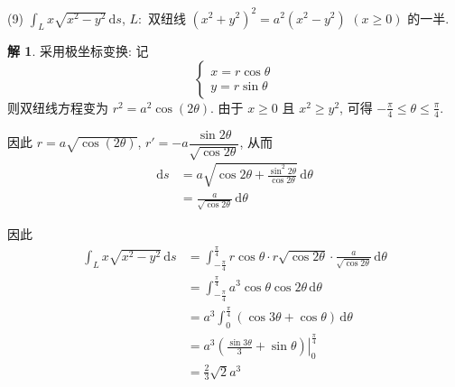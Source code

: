 \documentclass[a4paper,12pt]{article}
\theoremstyle{definition}
\newtheorem*{sol}{解}
\begin{document}
(9) $\int_L x\sqrt{x^2 - y^2} \, \mathrm{d}s$, $L:$ 双纽线 $(x^2 + y^2)^2 = a^2(x^2 - y^2)$ $(x \geqslant 0)$ 的一半.
\begin{sol}
    采用极坐标变换: 记
    $$
        \begin{cases}
            x = r\cos\theta \\
            y = r\sin\theta
        \end{cases}
    $$
    则双纽线方程变为 $r^2 = a^2\cos(2\theta)$. 由于 $x \geq 0$ 且 $x^2 \geq y^2$, 可得 $-\frac{\pi}{4} \leq \theta \leq \frac{\pi}{4}$.

    因此 $r = a\sqrt{\cos(2\theta)}$, $r' = -a\dfrac{\sin 2\theta}{\sqrt{\cos 2\theta}}$, 从而
    \begin{align*}
        \mathrm{d}s
         & = a\sqrt{\cos 2\theta + \frac{\sin^2 2\theta}{\cos 2\theta}} \, \mathrm{d}\theta \\
         & = \frac{a}{\sqrt{\cos 2\theta}} \, \mathrm{d}\theta
    \end{align*}

    因此
    \begin{align*}
        \int_L x\sqrt{x^2 - y^2} \, \mathrm{d}s
         & = \int_{-\frac{\pi}{4}}^{\frac{\pi}{4}} r\cos\theta \cdot r\sqrt{\cos 2\theta} \cdot \frac{a}{\sqrt{\cos 2\theta}} \, \mathrm{d}\theta \\
         & = \int_{-\frac{\pi}{4}}^{\frac{\pi}{4}} a^3\cos\theta\cos 2\theta \, \mathrm{d}\theta                                                  \\
         & = a^3 \int_0^{\frac{\pi}{4}} (\cos 3\theta + \cos\theta) \, \mathrm{d}\theta                                                           \\
         & = a^3 \left. \left( \frac{\sin 3\theta}{3} + \sin\theta \right) \right|_0^{\frac{\pi}{4}}                                              \\
         & = \frac{2}{3}\sqrt{2}a^3
    \end{align*}
\end{sol}
\end{document}

